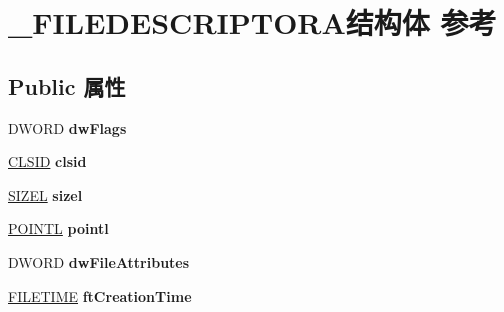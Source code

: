 \hypertarget{struct___f_i_l_e_d_e_s_c_r_i_p_t_o_r_a}{}\section{\+\_\+\+F\+I\+L\+E\+D\+E\+S\+C\+R\+I\+P\+T\+O\+R\+A结构体 参考}
\label{struct___f_i_l_e_d_e_s_c_r_i_p_t_o_r_a}
\subsection*{Public 属性}
\begin{DoxyCompactItemize}
\item 
\mbox{\label{struct___f_i_l_e_d_e_s_c_r_i_p_t_o_r_a_a79aa3344966bc6d58f69be66488771fa}} 
D\+W\+O\+RD {\bfseries dw\+Flags}
\item 
\mbox{\label{struct___f_i_l_e_d_e_s_c_r_i_p_t_o_r_a_ab8d70fab42fb1c675fb37f8957b8d0cc}} 
\hyperlink{struct___i_i_d}{C\+L\+S\+ID} {\bfseries clsid}
\item 
\mbox{\label{struct___f_i_l_e_d_e_s_c_r_i_p_t_o_r_a_af66a8dbf40f25afd9545f361d4526aad}} 
\hyperlink{structtag_s_i_z_e}{S\+I\+Z\+EL} {\bfseries sizel}
\item 
\mbox{\label{struct___f_i_l_e_d_e_s_c_r_i_p_t_o_r_a_a9a04570cbfa85cc44c82bc3b4bc01d5a}} 
\hyperlink{struct___p_o_i_n_t_l}{P\+O\+I\+N\+TL} {\bfseries pointl}
\item 
\mbox{\label{struct___f_i_l_e_d_e_s_c_r_i_p_t_o_r_a_aa27c64eb5337c4b579df826bb0ca7895}} 
D\+W\+O\+RD {\bfseries dw\+File\+Attributes}
\item 
\mbox{\label{struct___f_i_l_e_d_e_s_c_r_i_p_t_o_r_a_a486d354829ec95390425b7d1f5f7e4e9}} 
\hyperlink{struct___f_i_l_e_t_i_m_e}{F\+I\+L\+E\+T\+I\+ME} {\bfseries ft\+Creation\+Time}
\item 
\mbox{\label{struct___f_i_l_e_d_e_s_c_r_i_p_t_o_r_a_a051bd43c1dff580a0e9738fbdf2d0841}} 

\end{DoxyCompactItemize}
